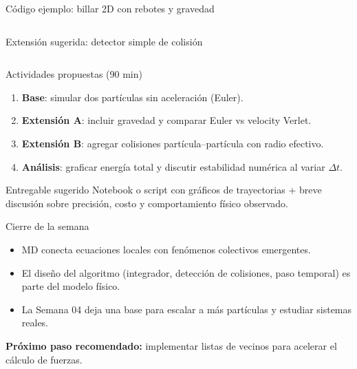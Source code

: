 \begin{frame}[fragile]{Código ejemplo: billar 2D con rebotes y gravedad}
\inputminted{python}{billiard_2d.py}
\end{frame}

\begin{frame}[fragile]{Extensión sugerida: detector simple de colisión}
\inputminted[firstline=57,lastline=91]{python}{md_velocity_verlet.py}
\end{frame}

\begin{frame}{Actividades propuestas (90 min)}
\begin{enumerate}
    \item \textbf{Base}: simular dos partículas sin aceleración (Euler).
    \item \textbf{Extensión A}: incluir gravedad y comparar Euler vs velocity Verlet.
    \item \textbf{Extensión B}: agregar colisiones partícula--partícula con radio efectivo.
    \item \textbf{Análisis}: graficar energía total y discutir estabilidad numérica al variar \(\Delta t\).
\end{enumerate}

\begin{block}{Entregable sugerido}
Notebook o script con gráficos de trayectorias + breve discusión sobre precisión, costo y comportamiento físico observado.
\end{block}
\end{frame}

\begin{frame}{Cierre de la semana}
\begin{itemize}
    \item MD conecta ecuaciones locales con fenómenos colectivos emergentes.
    \item El diseño del algoritmo (integrador, detección de colisiones, paso temporal) es parte del modelo físico.
    \item La Semana 04 deja una base para escalar a más partículas y estudiar sistemas reales.
\end{itemize}

\vspace{0.2cm}
\centering
\textbf{Próximo paso recomendado:} implementar listas de vecinos para acelerar el cálculo de fuerzas.
\end{frame}


